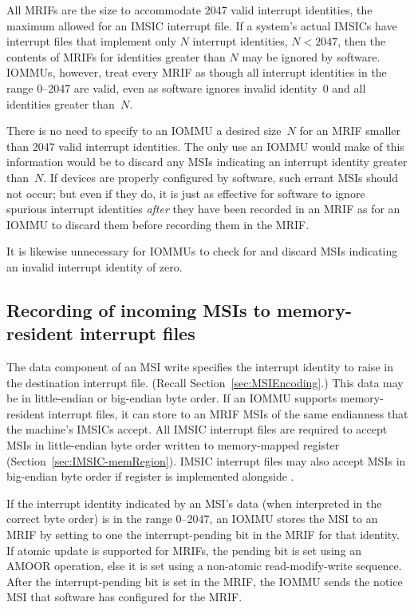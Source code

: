 All MRIFs are the size to accommodate 2047 valid interrupt identities,
the maximum allowed for an IMSIC interrupt file.
If a system's actual IMSICs have interrupt files that implement
only $N$ interrupt identities, ${N < \mbox{2047}}$, then the contents
of MRIFs for identities greater than $N$ may be ignored by software.
\mbox{IOMMU}s, however, treat every MRIF as though all interrupt identities
in the range 0--2047 are valid, even as software ignores invalid
identity~0 and all identities greater than~$N$.

\begin{commentary}
There is no need to specify to an \mbox{IOMMU} a desired size~$N$ for an
MRIF smaller than 2047 valid interrupt identities.
The only use an \mbox{IOMMU} would make of this information would be to
discard any MSIs indicating an interrupt identity greater than~$N$.
If devices are properly configured by software, such errant MSIs should
not occur;
but even if they do, it is just as effective for software to ignore
spurious interrupt identities \emph{after} they have been recorded in
an MRIF as for an \mbox{IOMMU} to discard them before recording them in the
MRIF.

It is likewise unnecessary for \mbox{IOMMU}s to check for and discard MSIs
indicating an invalid interrupt identity of zero.
\end{commentary}

\subsection{Recording of incoming MSIs to memory-resident interrupt files}

The data component of an MSI write specifies the interrupt identity to
raise in the destination interrupt file.
(Recall Section~\ref{sec:MSIEncoding}.)
This data may be in little-endian or big-endian byte order.
If an \mbox{IOMMU} supports memory-resident interrupt files, it can store to
an MRIF MSIs of the same endianness that the machine's IMSICs accept.
All IMSIC interrupt files are required to accept MSIs in little-endian
byte order written to memory-mapped register 
(Section~\ref{sec:IMSIC-memRegion}).
IMSIC interrupt files may also accept MSIs in big-endian byte order if
register  is implemented alongside .

If the interrupt identity indicated by an MSI's data (when interpreted
in the correct byte order) is in the range 0--2047, an \mbox{IOMMU} stores
the MSI to an MRIF by setting to one the interrupt-pending bit in the
MRIF for that identity.
If atomic update is supported for MRIFs, the pending bit is set using
an AMOOR operation, else it is set using a non-atomic read-modify-write
sequence.
After the interrupt-pending bit is set in the MRIF, the \mbox{IOMMU} sends
the notice MSI that software has configured for the MRIF.

